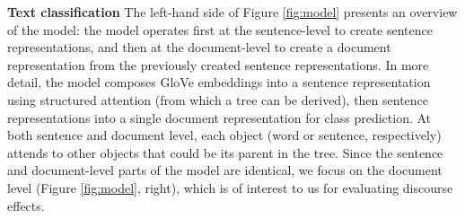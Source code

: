 \begin{table}[th!]
\small
\centering
{}
\caption{Max\thinspace$|$\thinspace\ mean (standard deviation) accuracy on the test set averaged across four training runs with different initialization weights. Bolded numbers are within 1 standard deviation of the best performing model. L\&L(orig) uses the original L\&L code; L\&L(ours) includes the design change and bug fix. L\&L(reported) lists results reported by L\&L on a single training run.
}
\label{tab:results_full}
\end{table}


\smallskip
\noindent \textbf{Text classification} The left-hand side of Figure \ref{fig:model} presents an overview of the model: the model operates first at the sentence-level to create sentence representations, and then at the document-level to create a document representation from the previously created sentence representations. In more detail, the model composes GloVe embeddings \cite{Pennington:2014} into a sentence representation using structured attention (from which a tree can be derived), then sentence representations into a single document representation for class prediction. At both sentence and document level, each object (word or sentence, respectively) attends to other objects that could be its parent in the tree. Since the sentence and document-level parts of the model are identical, we focus on the document level (Figure \ref{fig:model}, right), which is of interest to us for evaluating discourse effects. 

